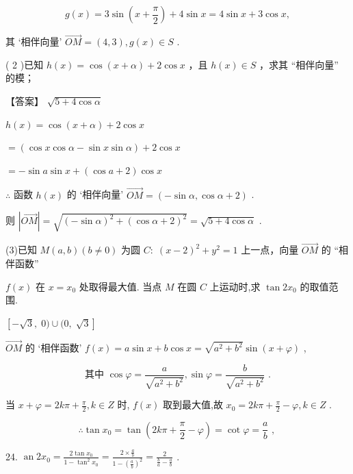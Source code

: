 \documentclass[10pt]{article}
\begin{document}
\[
g\left( x\right)  = 3\sin \left( {x + \frac{\pi }{2}}\right)  + 4\sin x = 4\sin x + 3\cos x,
\]

其 ‘相伴向量’ \(\overrightarrow{OM} = \left( {4,3}\right) ,g\left( x\right)  \in  S\) .

( 2 )已知 \(h\left( x\right)  = \cos \left( {x + \alpha }\right)  + 2\cos x\) ，且 \(h\left( x\right)  \in  S\) ，求其 “相伴向量” 的模；

【答案】 \(\sqrt{5 + 4\cos \alpha }\)

\(h\left( x\right)  = \cos \left( {x + \alpha }\right)  + 2\cos x\)

\(= \left( {\cos x\cos \alpha  - \sin x\sin \alpha }\right)  + 2\cos x\)

\(=  - \sin a\sin x + \left( {\cos a + 2}\right) \cos x\)

\(\therefore\) 函数 \(h\left( x\right)\) 的 ‘相伴向量’ \(\overrightarrow{OM} = \left( {-\sin \alpha ,\cos \alpha  + 2}\right)\) .

则 \(\left| \overrightarrow{OM}\right|  = \sqrt{{\left( -\sin \alpha \right) }^{2} + {\left( \cos \alpha  + 2\right) }^{2}} = \sqrt{5 + 4\cos \alpha }\) .

(3)已知 \(M\left( {a,b}\right) \left( {b \neq  0}\right)\) 为圆 \(C : \;{\left( x - 2\right) }^{2} + {y}^{2} = 1\) 上一点，向量 \(\overrightarrow{OM}\) 的 “相伴函数”

\(f\left( x\right)\) 在 \(x = {x}_{0}\) 处取得最大值. 当点 \(M\) 在圆 \(C\) 上运动时,求 \(\tan 2{x}_{0}\) 的取值范围.

\(\left\lbrack  {-\sqrt{3},\;0)\cup (0,\;\sqrt{3}}\right\rbrack\)

\(\overrightarrow{OM}\) 的 ‘相伴函数’ \(f\left( x\right)  = a\sin x + b\cos x = \sqrt{{a}^{2} + {b}^{2}}\sin \left( {x + \varphi }\right)\) ,

\[
\text{ 其中 }\cos \varphi  = \frac{a}{\sqrt{{a}^{2} + {b}^{2}}},\sin \varphi  = \frac{b}{\sqrt{{a}^{2} + {b}^{2}}}\text{ . }
\]

当 \(x + \varphi  = {2k\pi } + \frac{\pi }{2},k \in  Z\) 时, \(f\left( x\right)\) 取到最大值,故 \({x}_{0} = {2k\pi } + \frac{\pi }{2} - \varphi ,k \in  Z\) .

\[
\therefore \tan {x}_{0} = \tan \left( {{2k\pi } + \frac{\pi }{2} - \varphi }\right)  = \cot \varphi  = \frac{a}{b}\text{ , }
\]

24. \(\operatorname{an}2{x}_{0} = \frac{2\tan {x}_{0}}{1 - {\tan }^{2}{x}_{0}} = \frac{2 \times  \frac{a}{b}}{1 - {\left( \frac{a}{b}\right) }^{2}} = \frac{2}{\frac{b}{a} - \frac{a}{b}}\) .
\end{document}
